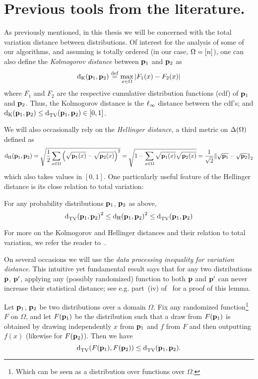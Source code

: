 \section{Previous tools from the literature.}\label{chap:preliminaries:previous:tools}
As previously mentioned, in this thesis we will be concerned with the total variation distance between distributions. Of interest for the analysis of some of our algorithms, and assuming \domain is totally ordered (in our case, $\domain=[n]$), one can also define the \emph{Kolmogorov distance} between $\D_1$ and $\D_2$ as
\begin{equation}\label{eq:def:dk}
  \kolmogorov{\D_1}{\D_2} \eqdef \max_{x\in \domain}\abs{F_1(x)-F_2(x)}
\end{equation}
where $F_1$ and $F_2$ are the respective cumulative distribution functions (cdf) of $\D_1$ and $\D_2$. Thus, the Kolmogorov distance is the $\lp[\infty]$ distance between the cdf's; and $\kolmogorov{\D_1}{\D_2} \leq \totalvardist{\D_1}{\D_2} \in [0,1]$. \smallskip

We will also occasionally rely on the \emph{Hellinger distance}, a third metric on $\distribs{\domain}$ defined as
\[
\hellinger{\D_1}{\D_2} = \sqrt{ \frac{1}{2}\sum_{x\in \domain}\left(\sqrt{\D_1(x)}-\sqrt{\D_2(x)}\right)^2 } = \sqrt{ 1-\sum_{x\in \domain} \sqrt{\D_1(x)}\sqrt{\D_2(x)} } = \frac{1}{\sqrt{2}}\normtwo{\sqrt{\D_1} - \sqrt{\D_2}}
\]
which also takes values in $[0,1]$. One particularly useful feature of the Hellinger distance is its close relation to total variation:
\begin{fact}\label{theorem:tv:hellinger}
  For any probability distributions $\D_1$, $\D_2$ as above,
  \begin{equation}\label{eq:tv:hellinger}
    \totalvardist{\D_1}{\D_2}^2 \leq \hellinger{\D_1}{\D_2}^2 \leq \totalvardist{\D_1}{\D_2}
  \end{equation}
\end{fact}
\noindent For more on the Kolmogorov and Hellinger distances and their relation to total variation, we refer the reader to~\cite[Appendix C]{Canonne:15:Survey}.

On several occasions we will use the \emph{data processing inequality for variation distance}.  This intuitive yet fundamental result says that for any two distributions $\D$, $\D'$,
applying any (possibly randomized) function to both $\D$ and $\D'$ can never increase their statistical distance; see e.g. part~(iv) of~\cite[Lemma 2]{Rey:11} for a proof of this
lemma.
\begin{fact}\label{lemma:data:processing:inequality:total:variation}
Let $\D_1$, $\D_2$ be two distributions over a domain $\Omega$. Fix any randomized function\footnote{Which can be seen as a distribution over functions over $\Omega$.}{} $F$ on $\Omega$, and let $F(\D_1)$ be the distribution such that a draw from $F(\D_1)$ is obtained by drawing independently $x$ from $\D_1$ and $f$ from $F$ and then outputting $f(x)$ (likewise for $F(\D_2)$).
Then we have
\[
\totalvardist{ F(\D_1) }{  F(\D_2) }  \leq \totalvardist{ \D_1 }{ \D_2 }.
\]
\end{fact}

